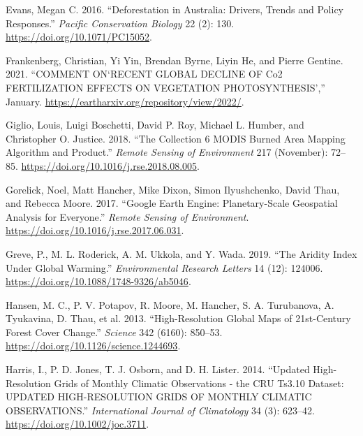 \documentclass[
]{article}
\newlength{\cslhangindent}
\newlength{\cslentryspacingunit} %
\newenvironment{CSLReferences}[2] %
 {%
  \setlength{\parindent}{0pt}
  \ifodd #1
  \let\oldpar\par
  \def\par{\hangindent=\cslhangindent\oldpar}
  \fi
  \setlength{\parskip}{#2\cslentryspacingunit}
 }%
 {}
\begin{document}
\begin{CSLReferences}{1}{0}
\leavevmode{}%
Evans, Megan C. 2016. {``Deforestation in {Australia}: Drivers, Trends
and Policy Responses.''} \emph{Pacific Conservation Biology} 22 (2):
130. \url{https://doi.org/10.1071/PC15052}.

\leavevmode{}%
Frankenberg, Christian, Yi Yin, Brendan Byrne, Liyin He, and Pierre
Gentine. 2021. {``{COMMENT ON}{`{RECENT GLOBAL DECLINE OF Co2
FERTILIZATION EFFECTS ON VEGETATION PHOTOSYNTHESIS}'},''} January.
\url{https://eartharxiv.org/repository/view/2022/}.

\leavevmode{}%
Giglio, Louis, Luigi Boschetti, David P. Roy, Michael L. Humber, and
Christopher O. Justice. 2018. {``The {Collection} 6 {MODIS} Burned Area
Mapping Algorithm and Product.''} \emph{Remote Sensing of Environment}
217 (November): 72--85. \url{https://doi.org/10.1016/j.rse.2018.08.005}.

\leavevmode{}%
Gorelick, Noel, Matt Hancher, Mike Dixon, Simon Ilyushchenko, David
Thau, and Rebecca Moore. 2017. {``Google {Earth Engine}:
{Planetary}-Scale Geospatial Analysis for Everyone.''} \emph{Remote
Sensing of Environment}.
\url{https://doi.org/10.1016/j.rse.2017.06.031}.

\leavevmode{}%
Greve, P., M. L. Roderick, A. M. Ukkola, and Y. Wada. 2019. {``The
Aridity {Index} Under Global Warming.''} \emph{Environmental Research
Letters} 14 (12): 124006.
\url{https://doi.org/10.1088/1748-9326/ab5046}.

\leavevmode{}%
Hansen, M. C., P. V. Potapov, R. Moore, M. Hancher, S. A. Turubanova, A.
Tyukavina, D. Thau, et al. 2013. {``High-{Resolution Global Maps} of
21st-{Century Forest Cover Change}.''} \emph{Science} 342 (6160):
850--53. \url{https://doi.org/10.1126/science.1244693}.

\leavevmode{}%
Harris, I., P. D. Jones, T. J. Osborn, and D. H. Lister. 2014.
{``Updated High-Resolution Grids of Monthly Climatic Observations - the
{CRU Ts3}.10 {Dataset}: {UPDATED HIGH}-{RESOLUTION GRIDS OF MONTHLY
CLIMATIC OBSERVATIONS}.''} \emph{International Journal of Climatology}
34 (3): 623--42. \url{https://doi.org/10.1002/joc.3711}.


\end{CSLReferences}
\end{document}
